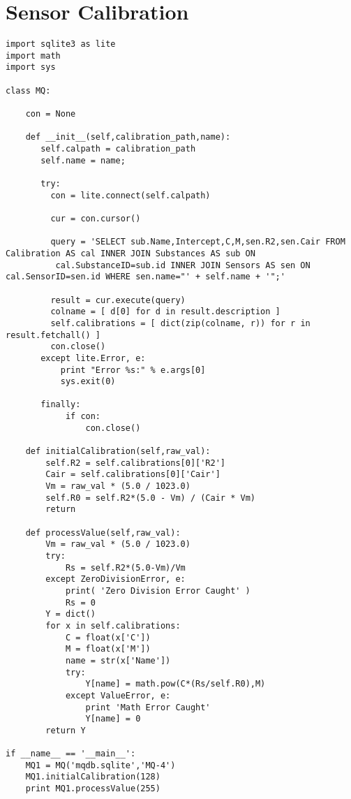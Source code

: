 \section{Sensor Calibration}
\begin{verbatim}
import sqlite3 as lite
import math
import sys

class MQ:

    con = None

    def __init__(self,calibration_path,name):
       self.calpath = calibration_path
       self.name = name;

       try:
         con = lite.connect(self.calpath)

         cur = con.cursor()

         query = 'SELECT sub.Name,Intercept,C,M,sen.R2,sen.Cair FROM Calibration AS cal INNER JOIN Substances AS sub ON
          cal.SubstanceID=sub.id INNER JOIN Sensors AS sen ON cal.SensorID=sen.id WHERE sen.name="' + self.name + '";'

         result = cur.execute(query)
         colname = [ d[0] for d in result.description ]
         self.calibrations = [ dict(zip(colname, r)) for r in result.fetchall() ]
         con.close()
       except lite.Error, e:
           print "Error %s:" % e.args[0]
           sys.exit(0)

       finally:
            if con:
                con.close()

    def initialCalibration(self,raw_val):
        self.R2 = self.calibrations[0]['R2'] 
        Cair = self.calibrations[0]['Cair']
        Vm = raw_val * (5.0 / 1023.0)
        self.R0 = self.R2*(5.0 - Vm) / (Cair * Vm)
        return

    def processValue(self,raw_val):
        Vm = raw_val * (5.0 / 1023.0)
        try:
            Rs = self.R2*(5.0-Vm)/Vm        
        except ZeroDivisionError, e:
            print( 'Zero Division Error Caught' )
            Rs = 0
        Y = dict()
        for x in self.calibrations: 
            C = float(x['C'])
            M = float(x['M'])
            name = str(x['Name'])
            try:
                Y[name] = math.pow(C*(Rs/self.R0),M)
            except ValueError, e:
                print 'Math Error Caught'
                Y[name] = 0
        return Y

if __name__ == '__main__':
    MQ1 = MQ('mqdb.sqlite','MQ-4')
    MQ1.initialCalibration(128)
    print MQ1.processValue(255)
\end{verbatim}


